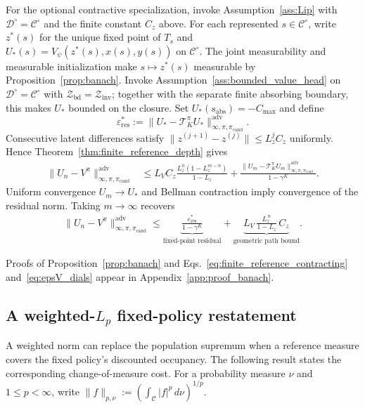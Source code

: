 \documentclass{article}
\theoremstyle{plain}
\theoremstyle{definition}
\theoremstyle{remark}
\begin{document}
For the optional contractive specialization, invoke
Assumption~\ref{ass:Lip} with $\mathcal D^\circ=\mathcal C^\circ$ and the
finite constant $C_z$ above. For each represented $s\in\mathcal C^\circ$,
write $z^*(s)$ for the unique fixed point of $T_s$ and
$U_*(s)=V_\psi(z^*(s),x(s),y(s))$ on $\mathcal C^\circ$. The joint measurability
and measurable initialization make $s\mapsto z^*(s)$ measurable by
Proposition~\ref{prop:banach}. Invoke
Assumption~\ref{ass:bounded_value_head} on
$\mathcal D^\circ=\mathcal C^\circ$ with
$\mathcal Z_{\mathrm{bd}}=\mathcal Z_{\mathrm{inv}}$; together with the
separate finite absorbing boundary, this makes $U_*$ bounded on the closure.
Set $U_*(s_{\mathrm{abs}})=-C_{\max}$ and define
\begin{equation}
\varepsilon_{\mathrm{res}}^* :=
\|U_* - \mathcal{T}^\pi_K U_*\|_{\infty,\pi,\pi_{\mathrm{cand}}}^{\mathrm{adv}}.
\label{eq:eps_res_def}
\end{equation}
Consecutive latent differences satisfy
$\|z^{(j+1)}-z^{(j)}\|\le L_z^j C_z$ uniformly. Hence
Theorem~\ref{thm:finite_reference_depth} gives
\begin{align}
\|U_n - V^\pi\|_{\infty,\pi,\pi_{\mathrm{cand}}}^{\mathrm{adv}}
&\le
L_V C_z\frac{L_z^n(1-L_z^{m-n})}{1-L_z}
+\frac{\|U_m-\mathcal T_K^\pi U_m\|_{\infty,\pi,\pi_{\mathrm{cand}}}^{\mathrm{adv}}}{1-\gamma^K}.
\label{eq:finite_reference_contracting}
\end{align}
Uniform convergence $U_m\to U_*$ and Bellman contraction imply convergence
of the residual norm. Taking $m\to\infty$ recovers
\begin{align}
\|U_n - V^\pi\|_{\infty,\pi,\pi_{\mathrm{cand}}}^{\mathrm{adv}}
\le
\underbrace{\frac{\varepsilon_{\mathrm{res}}^*}{1-\gamma^K}}_{\text{fixed-point residual}}
+
\underbrace{L_V\,\frac{L_z^{\,n}}{1-L_z}\,C_z}_{\text{geometric path bound}}.
\label{eq:epsV_dials}
\end{align}

Proofs of Proposition~\ref{prop:banach} and Eqs.~\eqref{eq:finite_reference_contracting} and~\eqref{eq:epsV_dials} appear in Appendix~\ref{app:proof_banach}.

\subsection{A weighted-\texorpdfstring{$L_p$}{Lp} fixed-policy restatement}
\label{app:weighted_lp}

A weighted norm can replace the population supremum when a reference
measure covers the fixed policy's discounted occupancy. The following result
states the corresponding change-of-measure cost. For
a probability measure $\nu$ and $1\le p<\infty$, write
\(
\|f\|_{p,\nu}:=(\int_{\mathcal C}|f|^p\,d\nu)^{1/p}.
\)
\end{document}
